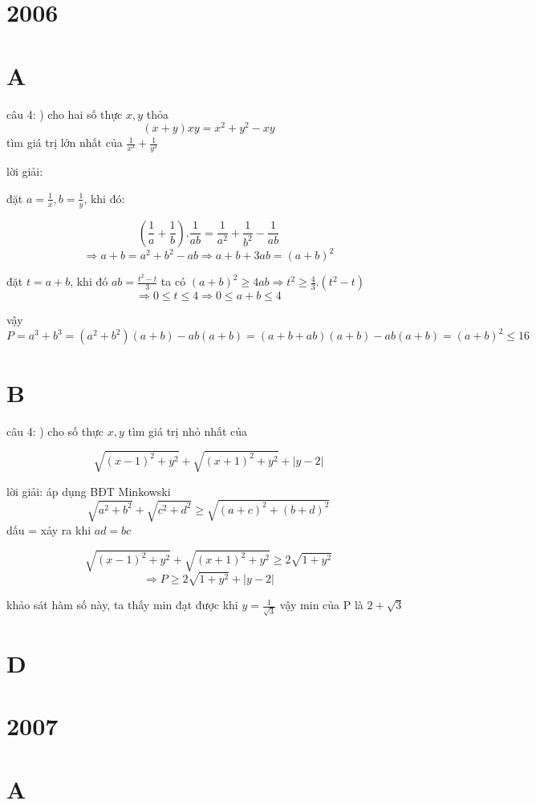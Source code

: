 \documentclass{article}
\begin{document}
\section*{2006}
\section*{A}

câu 4:
) cho hai số thực $x,y$ thỏa
\[(x+y)xy=x^2+y^2-xy\]
tìm giá trị lớn nhất của $\frac{1}{x^3}+\frac{1}{y^3}$

lời giải:

đặt $a=\frac{1}{x}, b=\frac{1}{y}$, khi đó:

\[(\frac{1}{a}+\frac{1}{b}).\frac{1}{ab}=\frac{1}{a^2}+\frac{1}{b^2}-\frac{1}{ab}\]
\[\Rightarrow a+b=a^2+b^2-ab\Rightarrow a+b+3ab=(a+b)^2\]

đặt $t=a+b$, khi đó $ab=\frac{t^2-t}{3}$
ta có $(a+b)^2\geq4ab\Rightarrow t^2\geq\frac{4}{3}.(t^2-t)$
\[\Rightarrow 0\leq t \leq 4 \Rightarrow 0\leq a+b \leq 4\]

vậy $P=a^3+b^3=(a^2+b^2)(a+b)-ab(a+b)=(a+b+ab)(a+b)-ab(a+b)=(a+b)^2\leq16$

\section*{B}

câu 4:
) cho số thực $x,y$ tìm giá trị nhỏ nhất của

\[\sqrt{(x-1)^2+y^2}+\sqrt{(x+1)^2+y^2}+|y-2| \]

lời giải: áp dụng BĐT Minkowski
\[\sqrt{a^2+b^2}+\sqrt{c^2+d^2}\geq\sqrt{(a+c)^2+(b+d)^2}\]
dấu = xảy ra khi $ad=bc$

\[\sqrt{(x-1)^2+y^2}+\sqrt{(x+1)^2+y^2}\geq 2\sqrt{1+y^2}\]
\[\Rightarrow P\geq 2\sqrt{1+y^2}+|y-2|\]

khảo sát hàm số này, ta thấy min đạt được khi $y=\frac{1}{\sqrt{3}}$
vậy min của P là $2+\sqrt{3}$

\section*{D}

\section*{2007}
\section*{A}
\end{document}
